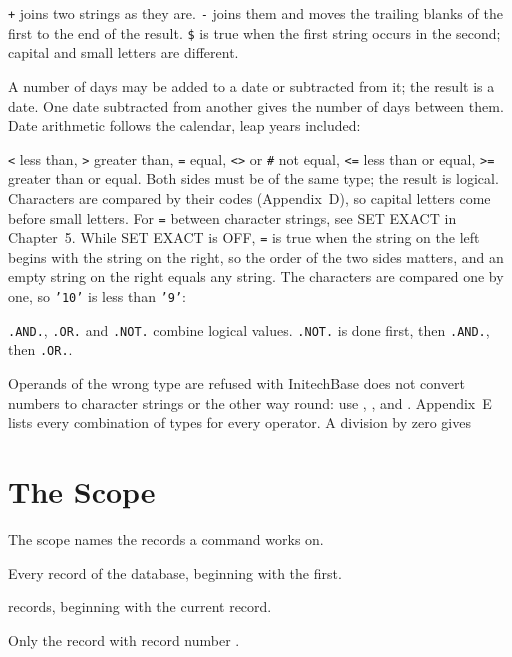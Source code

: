 \texttt{+} joins two strings as they are.  \texttt{-}
joins them and moves the trailing blanks of the first to the end of the
result.  \texttt{\$} is true when the first string occurs in the second;
capital and small letters are different.

A number of days may be added to a date or subtracted from it;
the result is a date.  One date subtracted from another gives the number of
days between them.
Date arithmetic follows the calendar, leap years included:

\texttt{<} less than, \texttt{>} greater than,
\texttt{=} equal, \texttt{<>} or \texttt{\#} not equal, \texttt{<=} less than or
equal, \texttt{>=} greater than or equal.  Both sides must be of the same type;
the result is logical.  Characters are compared by their codes (Appendix~D),
so capital letters come before small letters.  For \texttt{=} between
character strings, see SET EXACT in Chapter~5.  While SET EXACT is OFF, \texttt{=}
is true when the string on the left begins with the string on the right, so
the order of the two sides matters, and an empty string on the right equals
any string.  The characters are compared one by one, so \texttt{'10'} is less
than \texttt{'9'}:

\texttt{.AND.}, \texttt{.OR.} and \texttt{.NOT.} combine
logical values.  \texttt{.NOT.} is done first, then \texttt{.AND.}, then
\texttt{.OR.}.

Operands of the wrong type are refused with 
InitechBase does not convert numbers to character strings or the other way
round: use , ,  and .  Appendix~E
lists every combination of types for every operator.  A division by zero
gives 

\section{The Scope}
The scope names the records a command works on.

Every record of the database, beginning with the first.

 records, beginning with the current record.

Only the record with record number .

